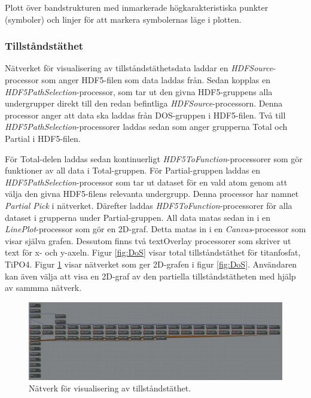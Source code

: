 \documentclass[10pt,oneside,swedish]{article}
\begin{document}
Plott över bandstrukturen med inmarkerade högkarakteristiska punkter
(symboler) och linjer för att markera symbolernas läge i plotten.

\subsubsection{Tillståndstäthet}\label{tillstuxe5ndstuxe4thet}

Nätverket för visualisering av tillståndstäthetsdata laddar en
\emph{HDFSource}-processor som anger HDF5-filen som data laddas från.
Sedan kopplas en \emph{HDF5PathSelection}-processor, som tar ut den
givna HDF5-gruppens alla undergrupper direkt till den redan befintliga
\emph{HDFSource}-processorn. Denna processor anger att data ska laddas
från DOS-gruppen i HDF5-filen. Två till
\emph{HDF5PathSelection}-processorer laddas sedan som anger grupperna
Total och Partial i HDF5-filen.

För Total-delen laddas sedan kontinuerligt
\emph{HDF5ToFunction}-processorer som gör funktioner av all data i
Total-gruppen. För Partial-gruppen laddas en
\emph{HDF5PathSelection}-processor som tar ut dataset för en vald atom
genom att välja den givna HDF5-filens relevanta undergrupp. Denna
processor har namnet \emph{Partial Pick} i nätverket. Därefter laddas
\emph{HDF5ToFunction}-processorer för alla dataset i grupperna under
Partial-gruppen. All data matas sedan in i en \emph{LinePlot}-processor
som gör en 2D-graf. Detta matas in i en \emph{Canvas}-processor som
visar själva grafen. Dessutom finns två textOverlay processorer som
skriver ut text för x- och y-axeln. Figur \ref{fig:DoS} visar total
tillståndstäthet för titanfosfat, TiPO4. Figur \ref{fig:DoSNetwork} visar
nätverket som ger 2D-grafen i figur \ref{fig:DoS}. Användaren kan även välja
att visa en 2D-graf av den partiella tillståndstätheten med hjälp av
sammma nätverk.

\begin{figure}[H]
\centering
\includegraphics[width=1.00000\textwidth]{Images/DoSNetwork.PNG}
\caption{Nätverk för visualisering av tillståndstäthet.}
\label{fig:DoSNetwork}
\end{figure}
\end{document}
